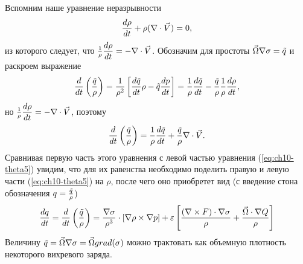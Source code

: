 Вспомним наше уравнение неразрывности 
\begin{equation*}
    \displaystyle\frac{d \rho}{d t} + \rho (\nabla\cdot\vec{V}) = 0,
\end{equation*}
из которого следует, что $\frac{1}{\rho}\displaystyle\frac{d \rho}{d t}=-\nabla\cdot\vec{V}$. Обозначим для простоты $\vec{\Omega}\nabla\sigma=\Tilde{q}$ и раскроем выражение 
\begin{equation*}
    \displaystyle\frac{d }{d t} \displaystyle \left( \frac{\Tilde{q}}{\rho} \right) = \frac{1}{\rho^2} \displaystyle \left[ \displaystyle\frac{d \Tilde{q}}{d t}\rho - \Tilde{q}\displaystyle\frac{d p}{d t} \right] = \frac{1}{\rho}\displaystyle\frac{d \Tilde{q}}{d t} - \frac{\Tilde{q}}{\rho}\frac{1}{\rho}\displaystyle\frac{d \rho}{d t},
\end{equation*}
но $\frac{1}{\rho}\displaystyle\frac{d \rho}{d t}=-\nabla\cdot\vec{V}$, поэтому
\begin{equation*}
    \displaystyle\frac{d }{d t} \displaystyle \left(  \frac{\Tilde{q}}{\rho}  \right) = \frac{1}{\rho}\displaystyle\frac{d \Tilde{q}}{d t} + \frac{\Tilde{q}}{\rho}\nabla\cdot\vec{V}.
\end{equation*}
Сравнивая первую часть этого уравнения с левой частью уравнения (\ref{eq:ch10-theta5}) увидим, что для их равенства необходимо поделить правую и левую части (\ref{eq:ch10-theta5}) на $\rho$, после чего оно приобретет вид (с введение стона обозначения $q=\frac{\Tilde{q}}{\rho}$) 
\begin{equation}
\label{eq:ch10-theta6}
    \displaystyle\frac{d q}{d t} = 
    \displaystyle\frac{d }{d t} \displaystyle \left(  \frac{\Tilde{q}}{\rho}  \right) = 
    \frac{\nabla\sigma}{\rho^3} \cdot \displaystyle \left[ \nabla\rho\times\nabla p \right] + 
    \varepsilon \displaystyle \left[  \frac{ (\nabla\times F)\cdot\nabla\sigma }{\rho} + 
    \frac{\vec{\Omega}\cdot\nabla Q}{\rho}  \right]
\end{equation}
Величину $\Tilde{q}=\vec{\Omega}\nabla\sigma=\vec{\Omega}grad(\sigma)$ можно трактовать как объемную плотность некоторого вихревого заряда. 

